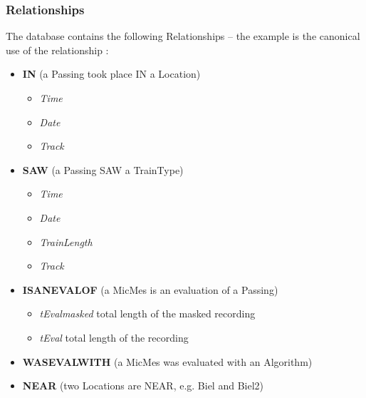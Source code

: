 \documentclass{article}\usepackage[]{graphicx}\usepackage[]{color}
\begin{document}
\subsubsection{Relationships} 
The database contains the following Relationships -- the example is the canonical use of the relationship :
\begin{itemize}
\item {\bf IN} (a Passing took place IN a Location)
  \begin{itemize}
    \item {\it Time}
    \item {\it Date}
    \item {\it Track}
  \end{itemize}
\item {\bf SAW} (a Passing SAW a TrainType)
  \begin{itemize}
    \item {\it Time}
    \item {\it Date}
    \item {\it TrainLength}
    \item {\it Track}
  \end{itemize}
\item {\bf ISANEVALOF} (a MicMes is an evaluation of a Passing)
  \begin{itemize}
    \item {\it tEvalmasked} total length of the masked recording
    \item {\it tEval} total length of the recording
  \end{itemize}
\item {\bf WASEVALWITH} (a MicMes was evaluated with an Algorithm)
\item {\bf NEAR} (two Locations are NEAR, e.g. Biel and Biel2)
\end{itemize}
\end{document}
